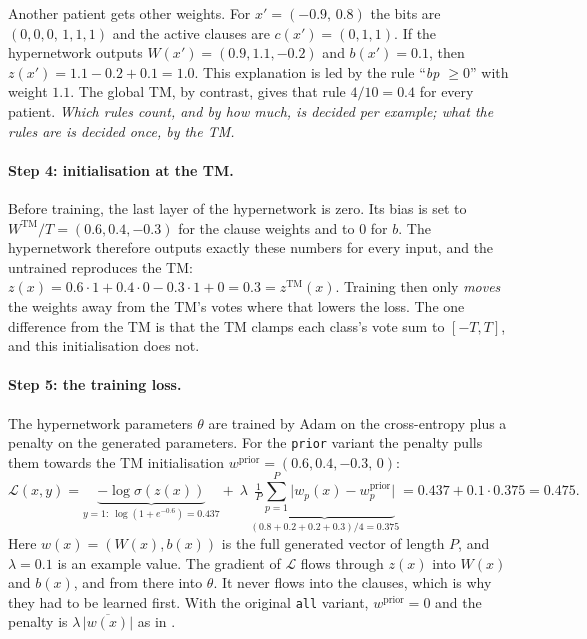 Another patient gets other weights. For $x'=(-0.9,\,0.8)$ the bits are $(0,0,0,\,1,1,1)$ and the active
clauses are $c(x')=(0,1,1)$. If the hypernetwork outputs $W(x')=(0.9,1.1,-0.2)$ and $b(x')=0.1$, then
$z(x')=1.1-0.2+0.1=1.0$. This explanation is led by the rule ``\emph{bp $\ge0$}'' with weight $1.1$. The
global TM, by contrast, gives that rule $4/10=0.4$ for every patient. \emph{Which rules count, and by
how much, is decided per example; what the rules are is decided once, by the TM.}

\paragraph{Step 4: initialisation at the TM.} Before training, the last layer of the hypernetwork is
zero. Its bias is set to $W^\text{TM}/T=(0.6,0.4,-0.3)$ for the clause weights and to $0$ for $b$. The
hypernetwork therefore outputs exactly these numbers for every input, and the untrained 
reproduces the TM: $z(x)=0.6\cdot1+0.4\cdot0-0.3\cdot1+0=0.3=z^\text{TM}(x)$. Training then only
\emph{moves} the weights away from the TM's votes where that lowers the loss. The one difference from
the TM is that the TM clamps each class's vote sum to $[-T,T]$, and this initialisation does not.

\paragraph{Step 5: the training loss.} The hypernetwork parameters $\theta$ are trained by Adam on the
cross-entropy plus a penalty on the generated parameters. For the \texttt{prior} variant the penalty
pulls them towards the TM initialisation $w^\text{prior}=(0.6,0.4,-0.3,\,0)$:
\[
  \mathcal{L}(x,y)=\underbrace{-\log\sigma(z(x))}_{y=1:\ \log(1+e^{-0.6})=0.437}
  +\ \lambda\,\underbrace{\tfrac{1}{P}\textstyle\sum_{p=1}^{P}\big|w_p(x)-w^\text{prior}_p\big|}_{(0.8+0.2+0.2+0.3)/4=0.375}
  =0.437+0.1\cdot0.375=0.475 .
\]
Here $w(x)=(W(x),b(x))$ is the full generated vector of length $P$, and $\lambda=0.1$ is an example
value. The gradient of $\mathcal{L}$ flows through $z(x)$ into $W(x)$ and $b(x)$, and from there into
$\theta$. It never flows into the clauses, which is why they had to be learned first. With the original
\texttt{all} variant, $w^\text{prior}=0$ and the penalty is $\lambda\,\overline{|w(x)|}$ as in \imn{}.

